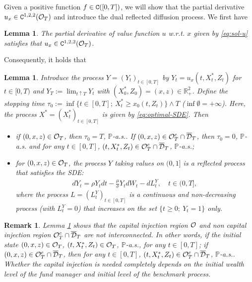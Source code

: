 \documentclass[11pt,times,letter]{article}
\newcommand{\Px}{ \mathbb{P} }
\newcommand{\R}{\mathds{R}}
\newcommand{\C}{{\tt{C}}}
\numberwithin{equation}{section}
\newtheorem{remark}[theorem]{Remark}
\newtheorem{lemma}[theorem]{Lemma}
\begin{document}
Given a positive function $f\in\C([0,T])$, we will show that the partial derivative $u_x\in \C^{1,2,2}({\cal O}_T)$ and introduce the dual reflected diffusion process. We first have
\begin{lemma}\label{lem:u_x}
The partial derivative of value function $u$ w.r.t. $x$ given by \eqref{eq:sol-u} satisfies that $u_x\in \C^{1,2,2}({\cal O}_T)$.
\end{lemma}
Consequently, it holds that
\begin{lemma}\label{lem:dual-process}
Introduce the process $Y=(Y_t)_{t\in [0,T]}$ by $Y_t=u_x(t,X_t^*,Z_t)$ for $t\in[0,T)$ and $Y_T:=\lim_{t\uparrow T}Y_t$ with $(X_0^*,Z_0)=(x,z)\in\R_+^2$. Define the stopping time $\tau_0:=\inf\{t\in[0,T];~X_t^*\geq x_0(t,Z_t)\}\wedge T$ ($\inf \emptyset=+\infty$). Here, the process $X^*=(X_t^*)_{t\in[0,T]}$ is given by \eqref{eq:optimal-SDE}. Then 
\begin{itemize}
\item[{\rm(i)}] if $(0,x,z)\in {\cal O}_T$, then $\tau_0=T$, $\Px$-a.s.. If $(0,x,z)\in {\cal O}_T^c\cap \overline{\mathcal{D}}_T$, then $\tau_0=0$, $\Px$-a.s. and for any $t\in[0,T]$, $(t,X_t^*,Z_t)\in  {\cal O}_T^c\cap \overline{\mathcal{D}}_T$, $\Px$-a.s.;
\item[{\rm(ii)}] for $(0,x,z)\in {\cal O}_T$, the process $Y$ taking values on $(0,1]$ is a reflected process that satisfies the SDE:
\begin{align}\label{eq:Yt}
dY_t= \rho Y_tdt-\frac{\mu}{\sigma}Y_tdW_t-dL_t^Y,\quad t\in(0,T],
\end{align}
where the process $L=(L_t^Y)_{t\in[0,T]}$ is a continuous and non-decreasing process (with $L_t^{Y}=0$) that increases on the set $\{t\geq 0;~Y_t=1\}$ only.
\end{itemize}
\end{lemma}


\begin{remark}\label{rem:injection}
Lemma \ref{lem:dual-process} shows that the capital injection region ${\cal O}$ and non capital injection region ${\cal O}_T^c\cap \overline{\mathcal{D}}_T$ are not interconnected. In other words, if the initial state $(0,x,z)\in {\cal O}_T$, $(t,X_t^*,Z_t)\in{\cal O}_T$, $\Px$-a.s., for any $t\in[0,T]$; if $(0,x,z)\in {\cal O}_T^c\cap \overline{\mathcal{D}}_T$, then for any $t\in[0,T]$, $(t,X_t^*,Z_t)\in  {\cal O}_T^c\cap \overline{\mathcal{D}}_T$, $\Px$-a.s.. Whether the capital injection is needed completely depends on the initial wealth level of the fund manager and  initial level of the benchmark process.
\end{remark}
\end{document}
